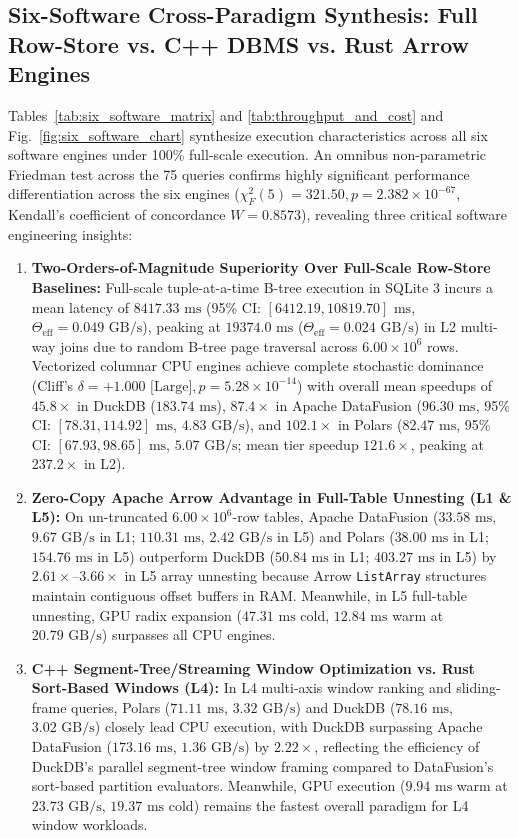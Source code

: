 \documentclass[10pt,a4paper]{article}
\begin{document}
\subsection{Six-Software Cross-Paradigm Synthesis: Full Row-Store vs. C++ DBMS vs. Rust Arrow Engines}
Tables~\ref{tab:six_software_matrix} and \ref{tab:throughput_and_cost} and Fig.~\ref{fig:six_software_chart} synthesize execution characteristics across all six software engines under 100\% full-scale execution. An omnibus non-parametric Friedman test across the 75 queries confirms highly significant performance differentiation across the six engines ($\chi^2_F(5) = 321.50, p = 2.382 \times 10^{-67}$, Kendall's coefficient of concordance $W = 0.8573$), revealing three critical software engineering insights:
\begin{enumerate}[leftmargin=1.5em,itemsep=2pt]
    \item \textbf{Two-Orders-of-Magnitude Superiority Over Full-Scale Row-Store Baselines:} Full-scale tuple-at-a-time B-tree execution in SQLite 3 incurs a mean latency of $8417.33\text{ ms}$ (95\% CI: $[6412.19, 10819.70]\text{ ms}$, $\Theta_{\text{eff}} = 0.049\text{ GB/s}$), peaking at $19374.0\text{ ms}$ ($\Theta_{\text{eff}} = 0.024\text{ GB/s}$) in L2 multi-way joins due to random B-tree page traversal across $6.00\times 10^6$ rows. Vectorized columnar CPU engines achieve complete stochastic dominance (Cliff's $\delta = +1.000\text{ [Large]}, p = 5.28 \times 10^{-14}$) with overall mean speedups of $45.8\times$ in DuckDB ($183.74\text{ ms}$), $87.4\times$ in Apache DataFusion ($96.30\text{ ms}$, 95\% CI: $[78.31, 114.92]\text{ ms}$, $4.83\text{ GB/s}$), and $102.1\times$ in Polars ($82.47\text{ ms}$, 95\% CI: $[67.93, 98.65]\text{ ms}$, $5.07\text{ GB/s}$; mean tier speedup $121.6\times$, peaking at $237.2\times$ in L2).
    \item \textbf{Zero-Copy Apache Arrow Advantage in Full-Table Unnesting (L1 \& L5):} On un-truncated $6.00\times 10^6$-row tables, Apache DataFusion ($33.58\text{ ms}$, $9.67\text{ GB/s}$ in L1; $110.31\text{ ms}$, $2.42\text{ GB/s}$ in L5) and Polars ($38.00\text{ ms}$ in L1; $154.76\text{ ms}$ in L5) outperform DuckDB ($50.84\text{ ms}$ in L1; $403.27\text{ ms}$ in L5) by $2.61\times\text{--}3.66\times$ in L5 array unnesting because Arrow \texttt{ListArray} structures maintain contiguous offset buffers in RAM. Meanwhile, in L5 full-table unnesting, GPU radix expansion ($47.31\text{ ms}$ cold, $12.84\text{ ms}$ warm at $20.79\text{ GB/s}$) surpasses all CPU engines.
    \item \textbf{C++ Segment-Tree/Streaming Window Optimization vs. Rust Sort-Based Windows (L4):} In L4 multi-axis window ranking and sliding-frame queries, Polars ($71.11\text{ ms}$, $3.32\text{ GB/s}$) and DuckDB ($78.16\text{ ms}$, $3.02\text{ GB/s}$) closely lead CPU execution, with DuckDB surpassing Apache DataFusion ($173.16\text{ ms}$, $1.36\text{ GB/s}$) by $\mathbf{2.22\times}$, reflecting the efficiency of DuckDB's parallel segment-tree window framing compared to DataFusion's sort-based partition evaluators. Meanwhile, GPU execution ($9.94\text{ ms}$ warm at $23.73\text{ GB/s}$, $19.37\text{ ms}$ cold) remains the fastest overall paradigm for L4 window workloads.
\end{enumerate}
\end{document}

